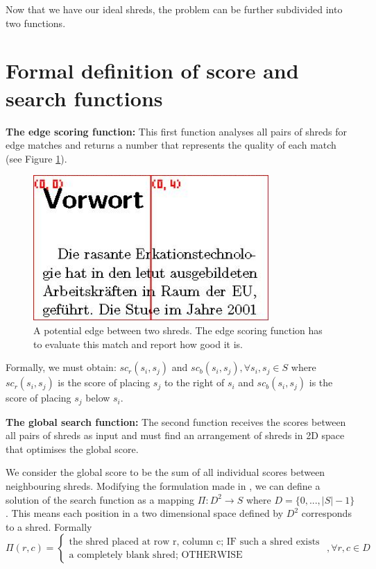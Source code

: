 Now that we have our ideal shreds, the problem can be further subdivided into two functions.

\section{Formal definition of score and search functions}
\textbf{The edge scoring function:} This first function analyses all pairs of shreds for edge matches and returns a number that represents the quality of each match (see Figure \ref{fig:edgeMatch}).

\begin{figure}[h]
    \centering
    \includegraphics[width=0.8\textwidth]{conf}
    \caption{A potential edge between two shreds. The edge scoring function has to evaluate this match and report how good it is.}
    \label{fig:edgeMatch}
\end{figure}

Formally, we must obtain: $sc_r(s_i, s_j)$ and $sc_b(s_i, s_j), \forall s_i, s_j \in S $ where  $sc_r(s_i, s_j)$ is the score of placing $s_j$ to the right of $s_i$ and $sc_b(s_i, s_j)$ is the score of placing $s_j$ below $s_i$.

\textbf{The global search function:} The second function receives the scores between all pairs of shreds as input and must find an arrangement of shreds in 2D space that optimises the global score.

We consider the global score to be the sum of all individual scores between neighbouring shreds. Modifying the formulation made in \cite{P20}, we can define a solution of the search function as a mapping $ \Pi : D^2 \rightarrow S$ where $D = \{0, ..., |S|-1\}$. This means each position in a two dimensional space defined by $D^2$ corresponds to a shred. Formally
\[
\Pi(r,c) =
\left\{
	\begin{array}{ll}
		\mbox{the shred placed at row r, column c; IF such a shred exists } \\
		\mbox{a completely blank shred; OTHERWISE }
	\end{array}
\right.
, \forall r,c \in D \]

